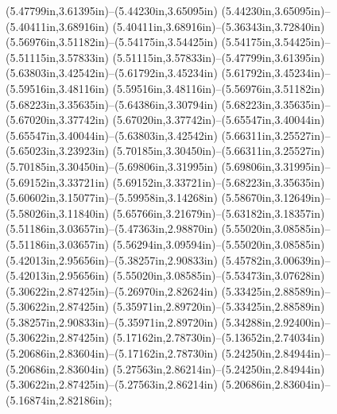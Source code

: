 (5.47799in,3.61395in)--(5.44230in,3.65095in) (5.44230in,3.65095in)--(5.40411in,3.68916in) (5.40411in,3.68916in)--(5.36343in,3.72840in) (5.56976in,3.51182in)--(5.54175in,3.54425in) (5.54175in,3.54425in)--(5.51115in,3.57833in) (5.51115in,3.57833in)--(5.47799in,3.61395in) (5.63803in,3.42542in)--(5.61792in,3.45234in) (5.61792in,3.45234in)--(5.59516in,3.48116in) (5.59516in,3.48116in)--(5.56976in,3.51182in) (5.68223in,3.35635in)--(5.64386in,3.30794in) (5.68223in,3.35635in)--(5.67020in,3.37742in) (5.67020in,3.37742in)--(5.65547in,3.40044in) (5.65547in,3.40044in)--(5.63803in,3.42542in) (5.66311in,3.25527in)--(5.65023in,3.23923in) (5.70185in,3.30450in)--(5.66311in,3.25527in) (5.70185in,3.30450in)--(5.69806in,3.31995in) (5.69806in,3.31995in)--(5.69152in,3.33721in) (5.69152in,3.33721in)--(5.68223in,3.35635in) (5.60602in,3.15077in)--(5.59958in,3.14268in) (5.58670in,3.12649in)--(5.58026in,3.11840in) (5.65766in,3.21679in)--(5.63182in,3.18357in) (5.51186in,3.03657in)--(5.47363in,2.98870in) (5.55020in,3.08585in)--(5.51186in,3.03657in) (5.56294in,3.09594in)--(5.55020in,3.08585in) (5.42013in,2.95656in)--(5.38257in,2.90833in) (5.45782in,3.00639in)--(5.42013in,2.95656in) (5.55020in,3.08585in)--(5.53473in,3.07628in) (5.30622in,2.87425in)--(5.26970in,2.82624in) (5.33425in,2.88589in)--(5.30622in,2.87425in) (5.35971in,2.89720in)--(5.33425in,2.88589in) (5.38257in,2.90833in)--(5.35971in,2.89720in) (5.34288in,2.92400in)--(5.30622in,2.87425in) (5.17162in,2.78730in)--(5.13652in,2.74034in) (5.20686in,2.83604in)--(5.17162in,2.78730in) (5.24250in,2.84944in)--(5.20686in,2.83604in) (5.27563in,2.86214in)--(5.24250in,2.84944in) (5.30622in,2.87425in)--(5.27563in,2.86214in) (5.20686in,2.83604in)--(5.16874in,2.82186in);
